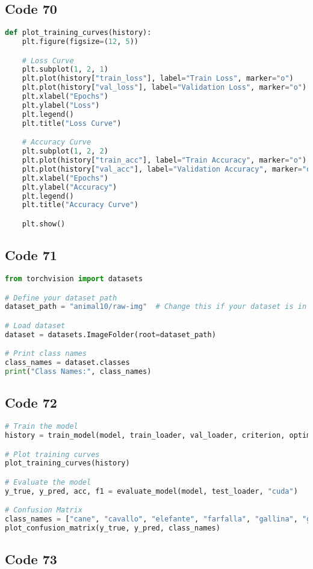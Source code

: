 \documentclass{article}
\begin{document}
\subsection*{Code 70}
\begin{lstlisting}[language=Python]
def plot_training_curves(history):
    plt.figure(figsize=(12, 5))

    # Loss Curve
    plt.subplot(1, 2, 1)
    plt.plot(history["train_loss"], label="Train Loss", marker="o")
    plt.plot(history["val_loss"], label="Validation Loss", marker="o")
    plt.xlabel("Epochs")
    plt.ylabel("Loss")
    plt.legend()
    plt.title("Loss Curve")

    # Accuracy Curve
    plt.subplot(1, 2, 2)
    plt.plot(history["train_acc"], label="Train Accuracy", marker="o")
    plt.plot(history["val_acc"], label="Validation Accuracy", marker="o")
    plt.xlabel("Epochs")
    plt.ylabel("Accuracy")
    plt.legend()
    plt.title("Accuracy Curve")

    plt.show()

\end{lstlisting}

\subsection*{Code 71}
\begin{lstlisting}[language=Python]
from torchvision import datasets

# Define your dataset path
dataset_path = "animal10/raw-img"  # Change this if your dataset is in a different location

# Load dataset
dataset = datasets.ImageFolder(root=dataset_path)

# Print class names
class_names = dataset.classes
print("Class Names:", class_names)

\end{lstlisting}

\subsection*{Code 72}
\begin{lstlisting}[language=Python]
# Train the model
history = train_model(model, train_loader, val_loader, criterion, optimizer, epochs=10, device="cuda")

# Plot training curves
plot_training_curves(history)

# Evaluate the model
y_true, y_pred, acc, f1 = evaluate_model(model, test_loader, "cuda")

# Confusion Matrix
class_names = ["cane", "cavallo", "elefante", "farfalla", "gallina", "gatto", "mucca", "pecora", "ragno", "scoiattolo"]  # Update based on Animal-10 classes
plot_confusion_matrix(y_true, y_pred, class_names)

\end{lstlisting}

\subsection*{Code 73}
\begin{lstlisting}[language=Python]

\end{lstlisting}
\end{document}
